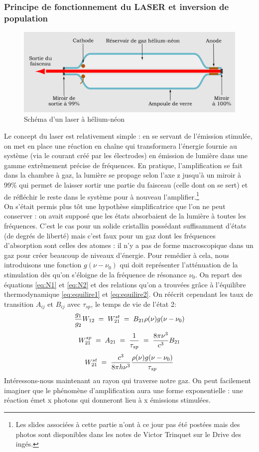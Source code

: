 \subsubsection{Principe de fonctionnement du LASER et inversion de population}
\begin{figure}[tph]
    \centering
    \includegraphics[scale=0.7]{Images2/Laser.png}
    \caption{Schéma d'un laser à hélium-néon}
    \label{fig:Laser}
\end{figure}
Le concept du laser est relativement simple : en se servant de l'émission stimulée, on met en place une réaction en chaîne qui transformera l'énergie fournie au système (via le courant créé par les électrodes) en émission de lumière dans une gamme extrêmement précise de fréquences. En pratique, l'amplification se fait dans la chambre à gaz, la lumière se propage selon l'axe z jusqu'à un miroir à 99\% qui permet de laisser sortir une partie du faisceau (celle dont on se sert) et de réfléchir le reste dans le système pour à nouveau l'amplifier.\footnote{Les slides associées à cette partie n'ont à ce jour pas été postées mais des photos sont disponibles dans les notes de Victor Trinquet sur le Drive des ingés.}\\

On s'était permis plus tôt une hypothèse simplificatrice que l'on ne peut conserver : on avait supposé que les états absorbaient de la lumière à toutes les fréquences. C'est le cas pour un solide cristallin possédant suffisamment d'états (de degrés de liberté) mais c'est faux pour un gaz dont les fréquences d'absorption sont celles des atomes : il n'y a pas de forme macroscopique dans un gaz pour créer beaucoup de niveaux d'énergie. Pour remédier à cela, nous introduisons une fonction $g(\nu - \nu_0)$ qui doit représenter l'atténuation de la stimulation dès qu'on s'éloigne de la fréquence de résonance $\nu_0$. On repart des équations \ref{eq:N1} et \ref{eq:N2} et des relations qu'on a trouvées grâce à l'équilibre thermodynamique \ref{eq:equilire1} et \ref{eq:equilire2}. On réécrit cependant les taux de transition $A_{ij}$ et $B_{ij}$ avec $\tau_{sp}$, le temps de vie de l'état 2:
\[
    \dfrac{g_1}{g_2}W_{12} \; = \; W_{21}^{st} \; = \; B_{21} \rho(\nu) g(\nu - \nu_0)
\]
\[
    W_{21}^{sp} \; = \; A_{21} \; = \; \dfrac{1}{\tau_{sp}} \; = \; \dfrac{8\pi \nu^3}{c^3}B_{21}
\]
\[
    W_{21}^{st} \; = \; \dfrac{c^3}{8\pi h \nu^3}\dfrac{\rho(\nu) g(\nu - \nu_0)}{\tau_{sp}}
\]
Intéressons-nous maintenant au rayon qui traverse notre gaz. On peut facilement imaginer que le phénomène d'amplification aura une forme exponentielle : une réaction émet x photons qui donneront lieu à x émissions stimulées.\\

